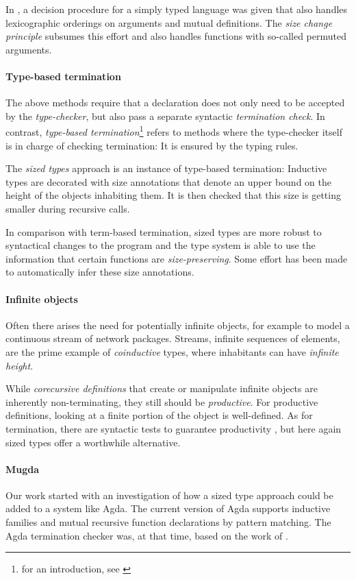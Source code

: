 In \cite{abelAltenkirch:predStRec}, a decision procedure for a simply typed language was given that also handles lexicographic orderings on arguments and mutual definitions.
The \emph{size change principle} \cite{lee01sizechange} subsumes this effort and also handles functions with so-called permuted arguments. 

\paragraph*{Type-based termination}
The above methods require that a declaration does not only need to be accepted by the \emph{type-checker}, but also pass a separate syntactic \emph{termination check}.
In contrast, \emph{type-based termination}\footnote{for an introduction, see \cite{abel:PhD}} refers to methods where the type-checker itself is in charge of checking termination: It is ensured by the typing rules. 

The \emph{sized types} approach is an instance of type-based termination:
Inductive types are decorated with size annotations that denote an upper bound on the height of the objects inhabiting them. 
It is then checked that this size is getting smaller during recursive calls.

In comparison with term-based termination, sized types are more robust to syntactical changes to the program and the type system is able to use the information that certain functions are \emph{size-preserving}.
Some effort \cite{bgp:lpar06} has been made to automatically infer these size annotations.

\paragraph{Infinite objects}
Often there arises the need for potentially infinite objects, for example to model a continuous stream of network packages.
Streams, infinite sequences of elements, are the prime example of \emph{coinductive} types, where inhabitants can have 
\emph{infinite height}. 

While \emph{corecursive definitions} that create or manipulate infinite objects are inherently non-terminating, they still should be \emph{productive}. For productive definitions, looking at a finite portion of the object is well-defined.
As for termination, there are syntactic tests to guarantee productivity \cite{coquand-infinite}, but here again sized types offer a worthwhile alternative.  

\paragraph*{Mugda}
Our work started with an investigation of how a sized type approach could be added to a system like Agda.
The current version of Agda supports inductive families and mutual recursive function declarations by pattern matching. 
The Agda termination checker was, at that time, based on the work of \cite{abelAltenkirch:predStRec}.


